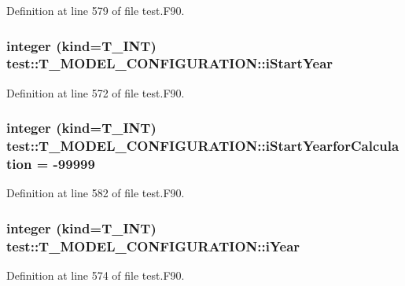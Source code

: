 Definition at line 579 of file test.F90.

\hypertarget{typetest_1_1_t___m_o_d_e_l___c_o_n_f_i_g_u_r_a_t_i_o_n_a52c7659bfa176f2f64f45651c41519c9}{
\subsubsection[{iStartYear}]{\setlength{\rightskip}{0pt plus 5cm}integer (kind={\bf T\_\-INT}) {\bf test::T\_\-MODEL\_\-CONFIGURATION::iStartYear}}}
\label{typetest_1_1_t___m_o_d_e_l___c_o_n_f_i_g_u_r_a_t_i_o_n_a52c7659bfa176f2f64f45651c41519c9}


Definition at line 572 of file test.F90.

\hypertarget{typetest_1_1_t___m_o_d_e_l___c_o_n_f_i_g_u_r_a_t_i_o_n_ac4f0134042449fa35fc01ddc10403b57}{
\subsubsection[{iStartYearforCalculation}]{\setlength{\rightskip}{0pt plus 5cm}integer (kind={\bf T\_\-INT}) {\bf test::T\_\-MODEL\_\-CONFIGURATION::iStartYearforCalculation} = -\/99999}}
\label{typetest_1_1_t___m_o_d_e_l___c_o_n_f_i_g_u_r_a_t_i_o_n_ac4f0134042449fa35fc01ddc10403b57}


Definition at line 582 of file test.F90.

\hypertarget{typetest_1_1_t___m_o_d_e_l___c_o_n_f_i_g_u_r_a_t_i_o_n_a30420c6d7bb1e42891b2200260801f9c}{
\subsubsection[{iYear}]{\setlength{\rightskip}{0pt plus 5cm}integer (kind={\bf T\_\-INT}) {\bf test::T\_\-MODEL\_\-CONFIGURATION::iYear}}}
\label{typetest_1_1_t___m_o_d_e_l___c_o_n_f_i_g_u_r_a_t_i_o_n_a30420c6d7bb1e42891b2200260801f9c}


Definition at line 574 of file test.F90.

